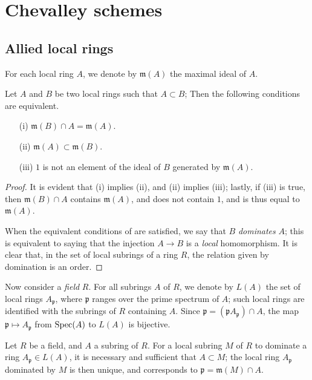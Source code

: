 \section{Chevalley schemes}
\label{section:I.8}

\subsection{Allied local rings}
\label{subsection:I.8.1}

For each local ring $A$, we denote by $\mathfrak{m}(A)$ the maximal ideal of $A$.
\begin{lemma}[8.1.1]
\label{I.8.1.1}
Let $A$ and $B$ be two local rings such that $A\subset B$;
Then the following conditions are equivalent.
\begin{enumerate}
  \item[{\rm(i)}] $\mathfrak{m}(B)\cap A=\mathfrak{m}(A)$.
  \item[{\rm(ii)}] $\mathfrak{m}(A)\subset\mathfrak{m}(B)$.
  \item[{\rm(iii)}] $1$ is not an element of the ideal of $B$ generated by $\mathfrak{m}(A)$.
\end{enumerate}
\end{lemma}

\begin{proof}
It is evident that (i) implies (ii), and (ii) implies (iii);
lastly, if (iii) is true, then $\mathfrak{m}(B)\cap A$ contains $\mathfrak{m}(A)$, and does not contain $1$, and is thus equal to $\mathfrak{m}(A)$.

When the equivalent conditions of  are satisfied, we say that $B$ \emph{dominates} $A$;
this is equivalent to saying that the injection $A\to B$ is a \emph{local} homomorphism.
It is clear that, in the set of local subrings of a ring $R$, the relation given by domination is an order.
\end{proof}

\begin{env}[8.1.2]
\label{I.8.1.2}
Now consider a \emph{field} $R$.
For all subrings $A$ of $R$, we denote by $L(A)$ the set of local rings $A_\mathfrak{p}$, where $\mathfrak{p}$ ranges over the prime spectrum of $A$;
such local rings are identified with the subrings of $R$ containing $A$.
Since $\mathfrak{p}=(\mathfrak{p}A_\mathfrak{p})\cap A$, the map $\mathfrak{p}\mapsto A_\mathfrak{p}$ from $\operatorname{Spec}(A)$ to $L(A)$ is bijective.
\end{env}

\begin{lemma}[8.1.3]
\label{I.8.1.3}
Let $R$ be a field, and $A$ a subring of $R$.
For a local subring $M$ of $R$ to dominate a ring $A_\mathfrak{p}\in L(A)$, it is necessary and sufficient that $A\subset M$;
the local ring $A_\mathfrak{p}$ dominated by $M$ is then unique, and corresponds to $\mathfrak{p}=\mathfrak{m}(M)\cap A$.
\end{lemma}

